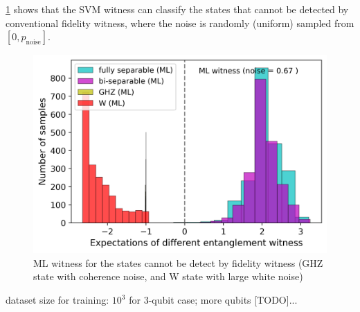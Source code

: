 \documentclass[
aps,
pra,
twocolumn,
floatfix,
]{revtex4-2}
\theoremstyle{plain}
\theoremstyle{definition}
\newcommand{\noise}{\text{noise}}
\begin{document}

\cref{fig:ml_compare} shows that the SVM witness can classify the states that cannot be detected by conventional fidelity witness,
where the noise is randomly (uniform) sampled from $[0,p_{\noise}]$.

\begin{figure}[!ht]
	\centering
		\includegraphics[width=.9\linewidth]{./Code/three_qubit_hist_ML.png}
	\caption{ML witness for the states cannot be detect by fidelity witness (GHZ state with coherence noise, and W state with large white noise)}
	\label{fig:ml_compare}
\end{figure}

dataset size for training: $10^3$ for 3-qubit case; more qubits [TODO]...
\end{document}
